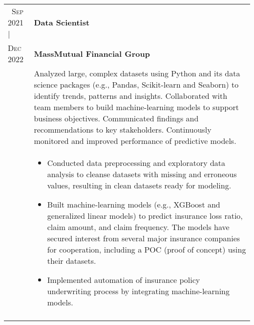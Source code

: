 \documentclass[10pt, oneside]{article}
\begin{document}
\begin{tabularx}{\linewidth}{p{2.2cm}|p{16cm}}
	\textsc{~Sep} 2021 | & \textbf{Data Scientist}\\
	\textsc{Dec 2022} & \textbf{MassMutual Financial Group}\\
	& Analyzed large, complex datasets using Python and its data science packages (e.g., Pandas, Scikit-learn and Seaborn) to identify trends, patterns and insights. Collaborated with team members to build machine-learning models to support business objectives. Communicated findings and recommendations to key stakeholders. Continuously monitored and improved performance of predictive models. \\
	&
	\begin{itemize}
		\item Conducted data preprocessing and exploratory data analysis to cleanse datasets with missing and erroneous values, resulting in clean datasets ready for modeling.
		\item Built machine-learning models (e.g., XGBoost and generalized linear models) to predict insurance loss ratio, claim amount, and claim frequency. The models have secured interest from several major insurance companies for cooperation, including a POC (proof of concept) using their datasets.
		\item Implemented automation of insurance policy underwriting process by integrating machine-learning models.
	\end{itemize}
	\\\\


\end{tabularx}
\end{document}
